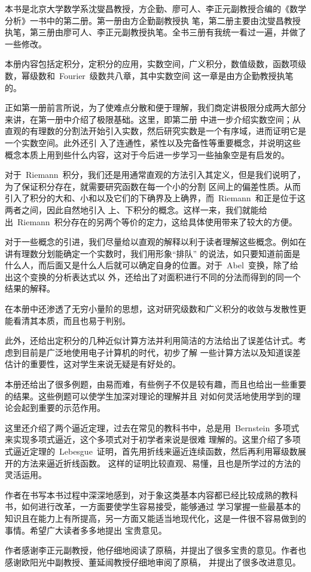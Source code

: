
\begin{preface}
本书是北京大学数学系沈燮昌教授，方企勤、廖可人、李正元副教授合编的《数学分析》一书中的第二册。第一册由方企勤副教授执
笔，第二册主要由沈燮昌教授执笔，第三册由廖可人、李正元副教授执笔。全书三册有我统一看过一遍，并做了一些修改。

本册内容包括定积分，定积分的应用，实数空间，广义积分，数值级数，函数项级数，幂级数和~Fourier~级数共八章，其中实数空间
这一章是由方企勤教授执笔的。

正如第一册前言所说，为了使难点分散和便于理解，我们商定讲极限分成两大部分来讲，在第一册中介绍了极限基础。这里，即第二册
中进一步介绍实数空间；从直观的有理数的分割法开始引入实数，然后研究实数是一个有序域，进而证明它是一个实数空间。此外还引
入了连通性，紧性以及完备性等重要概念，并说明这些概念本质上用到些什么内容，这对于今后进一步学习一些抽象空是有启发的。

对于~Riemann~积分，我们还是用通常直观的方法引入其定义，但是我们说明了，为了保证积分存在，就需要研究函数在每一个小的分割
区间上的偏差性质。从而引入了积分的大和、小和以及它们的下确界及上确界，而~Riemann~和正是位于这两者之间，因此自然地引入
上、下积分的概念。这样一来，我们就能给出~Riemann~积分存在的另两个等价的定力，这给具体使用带来了较大的方便。

对于一些概念的引进，我们尽量给以直观的解释以利于读者理解这些概念。例如在讲有理数分划能确定一个实数时，我们用形象“排队”
的说法，如只要知道前面是什么人，而后面又是什么人后就可以确定自身的位置。对于~Abel~变换，除了给出这个变换的分析表达式以
外，还给出了对面积进行不同的分法而得到的同一个结果的解释。

在本册中还渗透了无穷小量阶的思想，这对研究级数和广义积分的收敛与发散性更能看清其本质，而且也易于判别。

此外，还给出定积分的几种近似计算方法并利用简洁的方法给出了误差估计式。考虑到目前是广泛地使用电子计算机的时代，初步了解
一些计算方法以及知道误差估计的重要性，这对学生来说无疑是有好处的。

本册还给出了很多例题，由易而难，有些例子不仅是较有趣，而且也给出一些重要的结果。这些例题可以使学生加深对理论的理解并且
对如何灵活地使用学到的理论会起到重要的示范作用。

这里还介绍了两个逼近定理，过去在常见的教科书中，总是用~Bernstein~多项式来实现多项式逼近，这个多项式对于初学者来说是很难
理解的。这里介绍了多项式逼近定理的~Lebesgue~证明，首先用折线来逼近连续函数，然后再利用幂级数展开的方法来逼近折线函数。%
这样的证明比较直观、易懂，且也是所学过的方法的灵活运用。

作者在书写本书过程中深深地感到，对于象这类基本内容都已经比较成熟的教科书，如何进行改革，一方面要使学生容易接受，能够通过
学习掌握一些最基本的知识且在能力上有所提高，另一方面又能适当地现代化，这是一件很不容易做到的事情。希望广大读者多多地提出
宝贵意见。

作者感谢李正元副教授，他仔细地阅读了原稿，并提出了很多宝贵的意见。作者也感谢欧阳光中副教授、董延闿教授仔细地审阅了原稿，%
并提出了很多改进意见。
\end{preface}

\endinput
